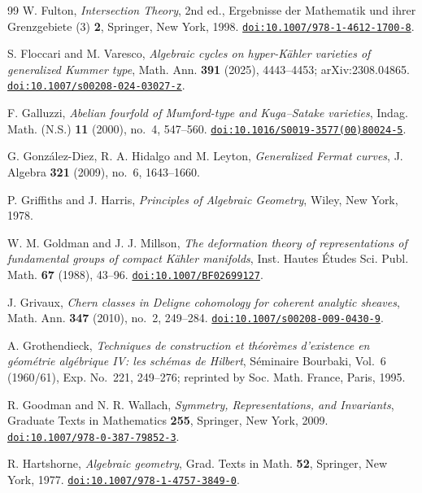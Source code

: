 \begin{thebibliography}{99}
W. Fulton,
\emph{Intersection Theory}, 2nd ed.,
Ergebnisse der Mathematik und ihrer Grenzgebiete (3) \textbf{2},
Springer, New York, 1998.
\href{https://doi.org/10.1007/978-1-4612-1700-8}{\texttt{doi:10.1007/978-1-4612-1700-8}}.

S. Floccari and M. Varesco,
\emph{Algebraic cycles on hyper-K\"ahler varieties of generalized Kummer
type},
Math. Ann. \textbf{391} (2025), 4443--4453; arXiv:2308.04865.
\href{https://doi.org/10.1007/s00208-024-03027-z}{\texttt{doi:10.1007/s00208-024-03027-z}}.

F. Galluzzi,
\emph{Abelian fourfold of Mumford-type and Kuga--Satake varieties},
Indag. Math. (N.S.) \textbf{11} (2000), no.~4, 547--560.
\href{https://doi.org/10.1016/S0019-3577(00)80024-5}{\texttt{doi:10.1016/S0019-3577(00)80024-5}}.

G. Gonz\'alez-Diez, R. A. Hidalgo and M. Leyton,
\emph{Generalized Fermat curves},
J. Algebra \textbf{321} (2009), no.~6, 1643--1660.

P. Griffiths and J. Harris,
\emph{Principles of Algebraic Geometry},
Wiley, New York, 1978.

W. M. Goldman and J. J. Millson,
\emph{The deformation theory of representations of fundamental groups of
compact K\"ahler manifolds},
Inst. Hautes \'Etudes Sci. Publ. Math. \textbf{67} (1988), 43--96.
\href{https://doi.org/10.1007/BF02699127}{\texttt{doi:10.1007/BF02699127}}.

J. Grivaux,
\emph{Chern classes in Deligne cohomology for coherent analytic sheaves},
Math. Ann. \textbf{347} (2010), no.~2, 249--284.
\href{https://doi.org/10.1007/s00208-009-0430-9}{\texttt{doi:10.1007/s00208-009-0430-9}}.

A. Grothendieck,
\emph{Techniques de construction et th\'eor\`emes d'existence en g\'eom\'etrie
alg\'ebrique IV: les sch\'emas de Hilbert},
S\'eminaire Bourbaki, Vol.~6 (1960/61), Exp. No.~221, 249--276;
reprinted by Soc. Math. France, Paris, 1995.

R. Goodman and N. R. Wallach,
\emph{Symmetry, Representations, and Invariants},
Graduate Texts in Mathematics \textbf{255}, Springer, New York, 2009.
\href{https://doi.org/10.1007/978-0-387-79852-3}{\texttt{doi:10.1007/978-0-387-79852-3}}.

R. Hartshorne,
\emph{Algebraic geometry},
Grad. Texts in Math. \textbf{52}, Springer, New York, 1977.
\href{https://doi.org/10.1007/978-1-4757-3849-0}{\texttt{doi:10.1007/978-1-4757-3849-0}}.


\end{thebibliography}
